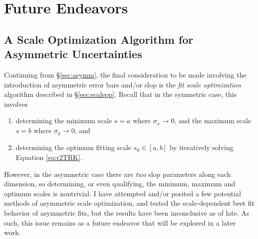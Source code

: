 \chapter{Future Endeavors}
\label{cha:future}

\section{A Scale Optimization Algorithm for Asymmetric Uncertainties}
Continuing from \S\ref{sec:asymm}, the final consideration to be made involving the introduction of asymmetric error bars and/or slop is the \textit{fit scale optimization} algorithm described in \S\ref{sec:scaleop}. Recall that in the symmetric case, this involves
\begin{enumerate}
    \item determining the minimum scale $s=a$ where $\sigma_x\rightarrow 0$, and the maximum scale $s=b$ where $\sigma_y\rightarrow 0$, and
    \item determining the optimum fitting scale $s_0\in [a,b]$ by iteratively solving Equation \eqref{eq:r2TRK}.
\end{enumerate}
However, in the asymmetric case there are \textit{two} slop parameters along each dimension, so determining, or even qualifying, the minimum, maximum and optimum scales is nontrivial. I have attempted and/or posited a few potential methods of asymmetric scale optimization, and tested the scale-dependent best fit behavior of asymmetric fits, but the results have been inconclusive as of late. As such, this issue remains as a future endeavor that will be explored in a later work.

